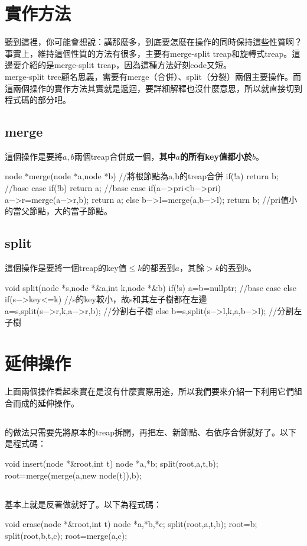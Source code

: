 \section{實作方法}
聽到這裡，你可能會想說：講那麼多，到底要怎麼在操作的同時保持這些性質啊？事實上，維持這個性質的方法有很多，主要有merge-split treap和旋轉式treap。這邊要介紹的是merge-split treap，因為這種方法好刻code又短。\\

merge-split tree顧名思義，需要有merge（合併）、split（分裂）兩個主要操作。而這兩個操作的實作方法其實就是遞迴，要詳細解釋也沒什麼意思，所以就直接切到程式碼的部分吧。
\subsection{merge}
這個操作是要將$a,b$兩個treap合併成一個，\textbf{其中$a$的所有key值都小於$b$}。
\begin{C++}
node *merge(node *a,node *b){ //將根節點為a,b的treap合併
	if(!a) return b; //base case
	if(!b) return a; //base case
	if(a−>pri<b−>pri){
		a−>r=merge(a−>r,b);
		return a;
	}else{
		b−>l=merge(a,b−>l);
		return b;
	} //pri值小的當父節點，大的當子節點。
}
\end{C++}
\subsection{split}
這個操作是要將一個treap的key值$\leq k$的都丟到$a$，其餘$>k$的丟到$b$。
\begin{C++}
void split(node *s,node *&a,int k,node *&b){
	if(!s) a=b=nullptr; //base case
	else if(s−>key<=k) //s的key較小，故s和其左子樹都在左邊
		a=s,split(s−>r,k,a−>r,b); //分割右子樹
	else 
		b=s,split(s−>l,k,a,b−>l); //分割左子樹
}
\end{C++}
\section{延伸操作}
上面兩個操作看起來實在是沒有什麼實際用途，所以我們要來介紹一下利用它們組合而成的延伸操作。
\subsection{}
的做法只需要先將原本的treap拆開，再把左、新節點、右依序合併就好了。以下是程式碼：
\begin{C++}
void insert(node *&root,int t){
	node *a,*b;
	split(root,a,t,b);
	root=merge(merge(a,new node(t)),b);
}
\end{C++}
\subsection{}
基本上就是反著做就好了。以下為程式碼：
\begin{C++}
void erase(node *&root,int t){
	node *a,*b,*c;
	split(root,a,t,b);
	root=b;
	split(root,b,t,c);
	root=merge(a,c);
}
\end{C++}
